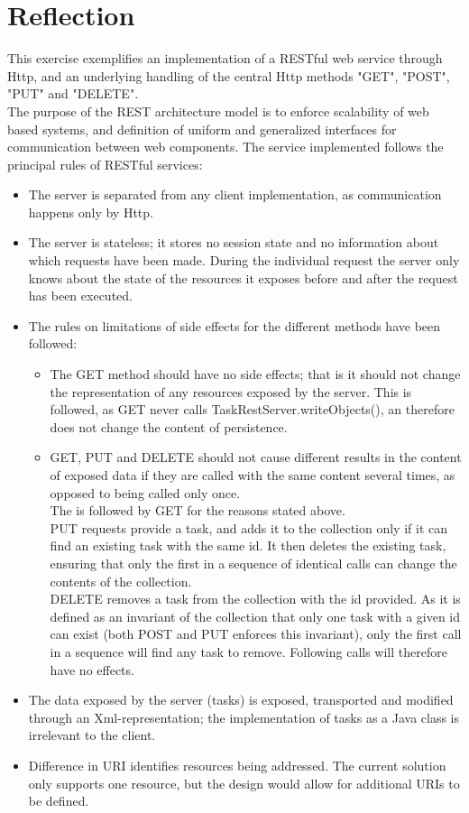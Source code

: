\documentclass{report}
\begin{document}
	\section{Reflection}
	\label{rest_reflection}
	This exercise exemplifies an implementation of a RESTful web service through Http, and an underlying handling of the central Http methods "GET", "POST", "PUT" and "DELETE".\\
	The purpose of the REST architecture model is to enforce scalability of web based systems, and definition of uniform and generalized interfaces for communication between web components. 
	The service implemented follows the principal rules of RESTful services:
	\begin{itemize}
		\item The server is separated from any client implementation, as communication happens only by Http.
		\item The server is stateless; it stores no session state and no information about which requests have been made. During the individual request the server only knows about the state of the resources it exposes before and after the request has been executed. 
		\item The rules on limitations of side effects for the different methods have been followed:
		\begin{itemize}
			\item The GET method should have no side effects; that is it should not change the representation of any resources exposed by the server. This is followed, as GET never calls TaskRestServer.writeObjects(), an therefore does not change the content of persistence. 
			\item GET, PUT and DELETE should not cause different results in the content of exposed data if they are called with the same content several times, as opposed to being called only once.\\
			The is followed by GET for the reasons stated above.\\
			PUT requests provide a task, and adds it to the collection only if it can find an existing task with the same id. It then deletes the existing task, ensuring that only the first in a sequence of identical calls can change the contents of the collection. \\
			DELETE removes a task from the collection with the id provided. As it is defined as an invariant of the collection that only one task with a given id can exist (both POST and PUT enforces this invariant), only the first call in a sequence will find any task to remove. Following calls will therefore have no effects. 
		\end{itemize}
		\item The data exposed by the server (tasks) is exposed, transported and modified through an Xml-representation; the implementation of tasks as a Java class is irrelevant to the client.
		\item Difference in URI identifies resources being addressed. The current solution only supports one resource, but the design would allow for additional URIs to be defined. 
	\end{itemize}
		
\end{document}
